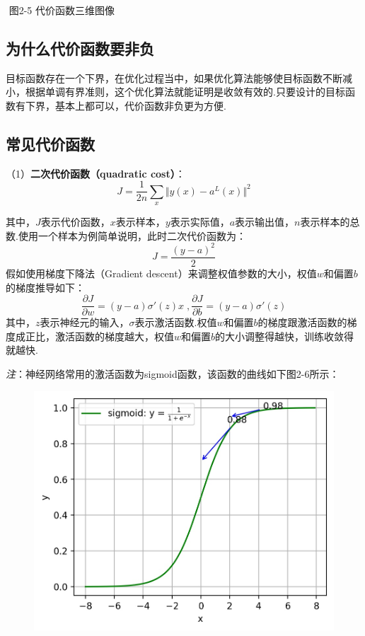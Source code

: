 ​ 图2-5 代价函数三维图像

\subsection{为什么代价函数要非负}\label{ux4e3aux4ec0ux4e48ux4ee3ux4ef7ux51fdux6570ux8981ux975eux8d1f}

​
目标函数存在一个下界，在优化过程当中，如果优化算法能够使目标函数不断减小，根据单调有界准则，这个优化算法就能证明是收敛有效的.
​ 只要设计的目标函数有下界，基本上都可以，代价函数非负更为方便.

\subsection{常见代价函数}\label{ux5e38ux89c1ux4ee3ux4ef7ux51fdux6570}

（1）\textbf{二次代价函数（quadratic cost）}： \[
J = \frac{1}{2n}\sum_x\Vert y(x)-a^L(x)\Vert^2
\]

​
其中，$J$表示代价函数，$x$表示样本，$y$表示实际值，$a$表示输出值，$n$表示样本的总数.使用一个样本为例简单说明，此时二次代价函数为：
\[
J = \frac{(y-a)^2}{2}
\] ​ 假如使用梯度下降法（Gradient
descent）来调整权值参数的大小，权值$w$和偏置$b$的梯度推导如下： \[
\frac{\partial J}{\partial w}=(y-a)\sigma'(z)x\;,
\frac{\partial J}{\partial b}=(y-a)\sigma'(z)
\]
其中，$z​$表示神经元的输入，$\sigma​$表示激活函数.权值$w​$和偏置$b​$的梯度跟激活函数的梯度成正比，激活函数的梯度越大，权值$w​$和偏置$b​$的大小调整得越快，训练收敛得就越快.

\emph{注}：神经网络常用的激活函数为sigmoid函数，该函数的曲线如下图2-6所示：

\begin{figure}
\centering
\includegraphics{./img/ch2/2.18/1.jpg}
\caption{}
\end{figure}

